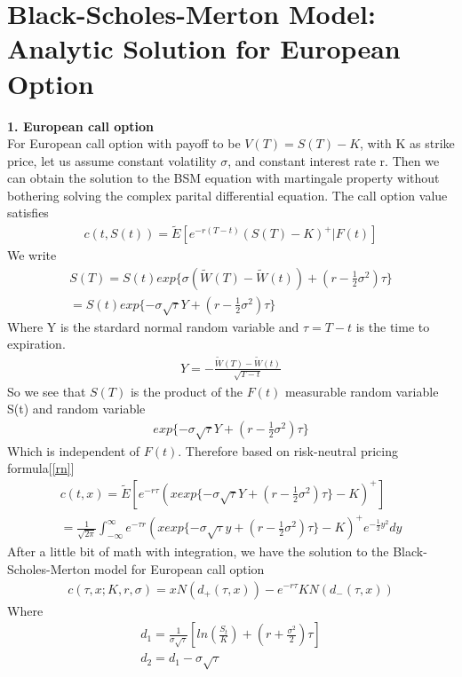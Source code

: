 \documentclass[a4paper]{article}
\begin{document}
\section{Black-Scholes-Merton Model: Analytic Solution for European Option}
{\bf1. European call option}\\
For European call option with payoff to be $V(T) = S(T) - K$, with K as strike price, let us assume constant volatility $\sigma$, and constant interest rate r. 
Then we can obtain the solution to the BSM equation with martingale property without bothering solving the complex parital
differential equation. The call option value satisfies
\begin{align*}
	c(t, S(t)) = \tilde E[e^{-r(T-t)}(S(T)-K)^+|F(t)]
\end{align*}
We write
\begin{align*}
	S(T) = S(t) exp\{\sigma(\tilde W(T) -\tilde W(t)) + (r - \frac{1}{2} \sigma^2) \tau\} \\
	     = S(t) exp\{-\sigma \sqrt{\tau} Y + (r - \frac{1}{2}\sigma^2)\tau\}
\end{align*}
Where Y is the stardard normal random variable and $\tau = T - t$ is the time to expiration. 
\begin{align*}
        Y = -\frac{\tilde W(T) - \tilde W(t)}{\sqrt{T - t}}
\end{align*}
So we see that $S(T)$ is the product of the $F(t)$ measurable random variable S(t) and random variable
\begin{align*}
        exp\{-\sigma \sqrt{\tau} Y +(r - \frac{1}{2} \sigma^2) \tau \}
\end{align*}
Which is independent of $F(t)$.
Therefore based on risk-neutral pricing formula[\ref{rn}]
\begin{align*}
        c(t,x) = \tilde E[e^{-r\tau}(x exp\{ -\sigma \sqrt{\tau} Y + (r - \frac{1}{2} \sigma^2)\tau\} -K)^+]\\
        = \frac{1}{\sqrt{2\pi}} \int_{-\infty}^{\infty} e^{-\tau r}(x exp\{-\sigma \sqrt{\tau} y
        +(r -\frac{1}{2}\sigma^2)\tau \} -K)^+ e^{-\frac{1}{2}y^2} dy
\end{align*}
After a little bit of math with integration, we have the solution to the Black-Scholes-Merton model for European call option
\begin{align*}
	c(\tau,x; K,r,\sigma) = xN(d_{+}(\tau,x)) - e^{-r\tau}KN(d_{-}(\tau,x))
\end{align*}
Where
\begin{align*}
	d_1 = \frac{1}{\sigma \sqrt{\tau}}[ln(\frac{S_t}{K}) + (r+ \frac{\sigma^2}{2})\tau] \\
	d_2 = d_1 - \sigma \sqrt{\tau}
\end{align*}
\end{document}
